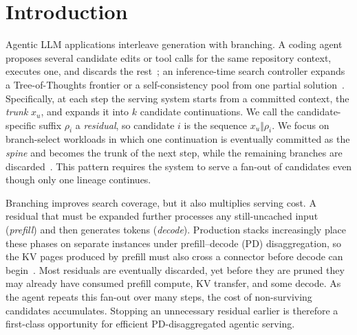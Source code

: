 \section{Introduction}
\label{sec:intro}

Agentic LLM applications interleave generation with branching.
A coding agent proposes several candidate edits or tool calls for the same repository context, executes one, and discards the rest~\cite{react,sweagent,openhands}; an inference-time search controller expands a Tree-of-Thoughts frontier or a self-consistency pool from one partial solution~\cite{tot,selfconsistency,cot}.
Specifically, at each step the serving system starts from a committed context, the \emph{trunk} $x_u$, and expands it into $k$ candidate continuations.
We call the candidate-specific suffix $\rho_i$ a \emph{residual}, so candidate $i$ is the sequence $x_u\Vert\rho_i$.
We focus on branch-select workloads in which one continuation is eventually committed as the \emph{spine} and becomes the trunk of the next step, while the remaining branches are discarded~\cite{gsm8k,math,esc}.
This pattern requires the system to serve a fan-out of candidates even though only one lineage continues.

Branching improves search coverage, but it also multiplies serving cost.
A residual that must be expanded further processes any still-uncached input (\emph{prefill}) and then generates tokens (\emph{decode}).
Production stacks increasingly place these phases on separate instances under prefill--decode (PD) disaggregation, so the KV pages produced by prefill must also cross a connector before decode can begin~\cite{distserve,splitwise}.
Most residuals are eventually discarded, yet before they are pruned they may already have consumed prefill compute, KV transfer, and some decode.
As the agent repeats this fan-out over many steps, the cost of non-surviving candidates accumulates.
Stopping an unnecessary residual earlier is therefore a first-class opportunity for efficient PD-disaggregated agentic serving.

